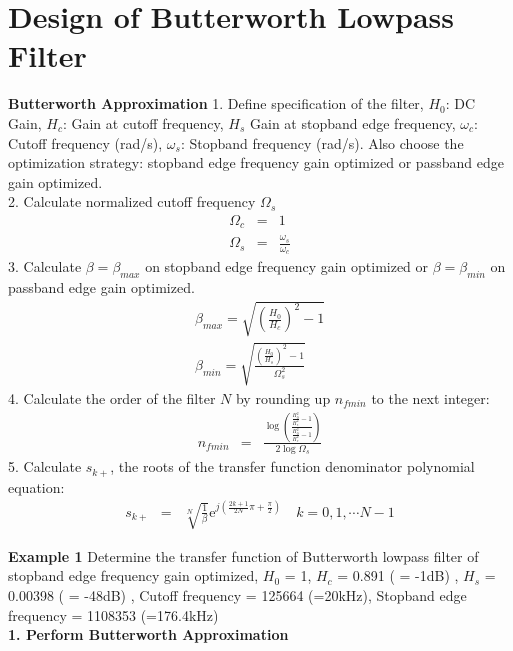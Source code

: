 ﻿\documentclass[a4j]{jarticle}
\begin{document}
\section{Design of Butterworth Lowpass Filter}

\begin{itembox}[l]{{\large {\bf Butterworth Approximation}}}
1. Define specification of the filter, \( H_0 \): DC Gain, \( H_c \): Gain at cutoff frequency, \( H_s \) Gain at stopband edge frequency, \( \omega_c \): Cutoff frequency (rad/s), \( \omega_s \): Stopband frequency (rad/s). 
Also choose the optimization strategy: stopband edge frequency gain optimized or passband edge gain optimized.\\
2. Calculate normalized cutoff frequency \( \Omega_s \)
\begin{eqnarray*}
\Omega_{c} &=& 1 \\
\Omega_{s} &=& \frac{\omega_s}{\omega_c}
\end{eqnarray*}
3. Calculate \( \beta = \beta_{max} \) on stopband edge frequency gain optimized or \( \beta = \beta_{min} \) on passband edge gain optimized.
\begin{eqnarray*}
\beta_{max} = \sqrt{\left(\frac{H_0}{H_c}\right)^2-1}\\
\beta_{min} = \sqrt{\frac{\left(\frac{H_0}{H_s}\right)^2-1}{\Omega_s^2}}
\end{eqnarray*}
4. Calculate the order of the filter \( N \) by rounding up \( n_{fmin} \) to the next integer:
\begin{eqnarray*}
n_{fmin} &=& \frac{\log\left(\frac{{\frac{H_0^2}{H_s^2}-1}}{{\frac{H_0^2}{H_c^2}-1}}\right)}{2\log\Omega_s}
\end{eqnarray*}
5. Calculate \( s_{k+} \), the roots of the transfer function denominator polynomial equation:
\begin{eqnarray*}
s_{k+} &=& \sqrt[N]{\frac{1}{\beta}}\mathrm{e}^{j\left(\frac{2k+1}{2N}\pi+\frac{\pi}{2}\right)}\quad k=0,1, \cdots N-1
\end{eqnarray*}
\end{itembox}

\clearpage

{\large {\bf Example 1}} Determine the transfer function of Butterworth lowpass filter of stopband edge frequency gain optimized,
 \( H_0 \) = 1, \( H_c \) = 0.891 ( = -1dB) , \( H_s \) = 0.00398 ( = -48dB) ,
 Cutoff frequency = 125664 (=20kHz), Stopband edge frequency = 1108353 (=176.4kHz) \\

{\large {\bf 1. Perform Butterworth Approximation}}
\end{document}
